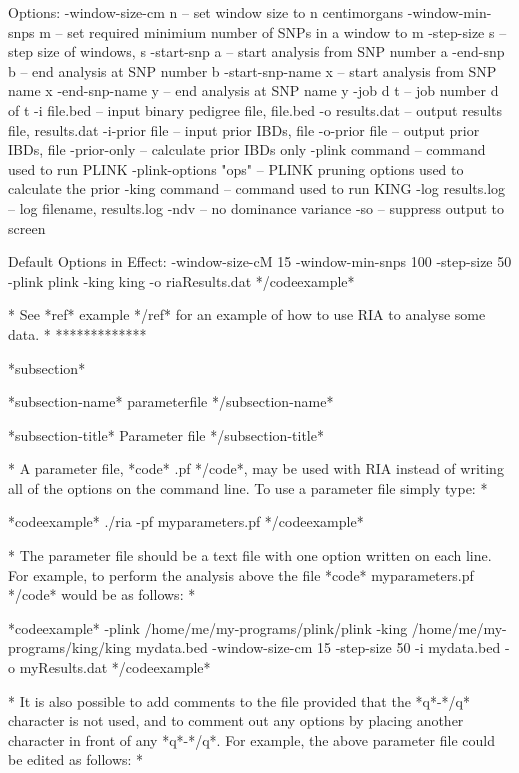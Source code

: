 Options:
  -window-size-cm n     -- set window size to n centimorgans
  -window-min-snps m    -- set required minimium number of SNPs in a window to m
  -step-size s          -- step size of windows, s
  -start-snp a          -- start analysis from SNP number a
  -end-snp b            -- end analysis at SNP number b
  -start-snp-name x     -- start analysis from SNP name x
  -end-snp-name y       -- end analysis at SNP name y
  -job d t              -- job number d of t
  -i file.bed           -- input binary pedigree file, file.bed
  -o results.dat        -- output results file, results.dat
  -i-prior file         -- input prior IBDs, file
  -o-prior file         -- output prior IBDs, file
  -prior-only           -- calculate prior IBDs only
  -plink command        -- command used to run PLINK
  -plink-options "ops"  -- PLINK pruning options used to calculate the prior
  -king command         -- command used to run KING
  -log results.log      -- log filename, results.log
  -ndv                  -- no dominance variance
  -so                   -- suppress output to screen

Default Options in Effect:
  -window-size-cM 15
  -window-min-snps 100
  -step-size 50
  -plink plink
  -king king
  -o riaResults.dat
*/codeexample*

*
See *ref* example */ref* for an example of how to use RIA to analyse some data.
*
*************

*subsection*

*subsection-name* parameterfile */subsection-name*

*subsection-title* Parameter file */subsection-title*

* A parameter file, *code* .pf */code*, may be used with RIA instead of writing all of the options on the command line. To use a parameter file simply type: *

*codeexample*
./ria -pf myparameters.pf
*/codeexample*

* The parameter file should be a text file with one option written on each line. For example, to perform the analysis above the file *code* myparameters.pf */code* would be as follows: *

*codeexample*
-plink /home/me/my-programs/plink/plink
-king /home/me/my-programs/king/king mydata.bed
-window-size-cm 15
-step-size 50
-i mydata.bed
-o myResults.dat
*/codeexample*

* It is also possible to add comments to the file provided that the *q*-*/q* character is not used, and to comment out any options by placing another character in front of any *q*-*/q*. For example, the above parameter file could be edited as follows: *


